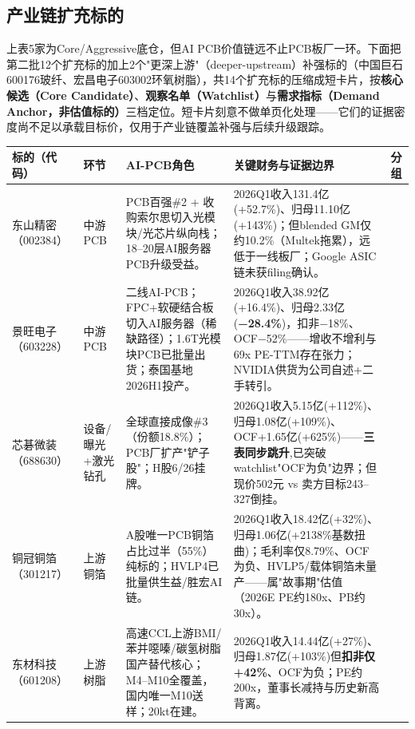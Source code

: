 \subsection{产业链扩充标的}

上表5家为Core/Aggressive底仓，但AI PCB价值链远不止PCB板厂一环。下面把第二批12个扩充标的加上2个"更深上游"（deeper-upstream）补强标的（中国巨石600176玻纤、宏昌电子603002环氧树脂），共14个扩充标的压缩成短卡片，按\textbf{核心候选（Core Candidate）}、\textbf{观察名单（Watchlist）}与\textbf{需求指标（Demand Anchor，非估值标的）}三档定位。短卡片刻意不做单页化处理——它们的证据密度尚不足以承载目标价，仅用于产业链覆盖补强与后续升级跟踪。

\begin{exhibitbox}[图表6-2：产业链扩充标的短卡片]
\footnotesize
\begin{tabularx}{\textwidth}{L{2.0cm}L{1.4cm}L{1.6cm}X L{1.9cm}}
\toprule
\textbf{标的（代码）} & \textbf{环节} & \textbf{AI-PCB角色} & \textbf{关键财务与证据边界} & \textbf{分组} \\
\midrule
东山精密（002384） & 中游PCB & PCB百强\#2 + 收购索尔思切入光模块/光芯片纵向栈；18--20层AI服务器PCB升级受益。 & 2026Q1收入131.4亿(+52.7\%)、归母11.10亿(+143\%)；但blended GM仅约10.2\%（Multek拖累），远低于一线板厂；Google ASIC链未获filing确认。 &  \\
\midrule
景旺电子（603228） & 中游PCB & 二线AI-PCB；FPC+软硬结合板切入AI服务器（稀缺路径）；1.6T光模块PCB已批量出货；泰国基地2026H1投产。 & 2026Q1收入38.92亿(+16.4\%)、归母2.33亿(\textbf{−28.4\%})，扣非−18\%、OCF−52\%——增收不增利与69x PE-TTM存在张力；NVIDIA供货为公司自述+二手转引。 &  \\
\midrule
芯碁微装（688630） & 设备/曝光+激光钻孔 & 全球直接成像\#3（份额18.8\%）；PCB厂扩产"铲子股"；H股6/26挂牌。 & 2026Q1收入5.15亿(+112\%)、归母1.08亿(+109\%)、OCF+1.65亿(+625\%)——\textbf{三表同步跳升},已突破watchlist"OCF为负"边界；但现价502元 vs 卖方目标243--327倒挂。 &  \\
\midrule
铜冠铜箔（301217） & 上游铜箔 & A股唯一PCB铜箔占比过半（55\%）纯标的；HVLP4已批量供生益/胜宏AI链。 & 2026Q1收入18.42亿(+32\%)、归母1.06亿(+2138\%基数扭曲)；毛利率仅8.79\%、OCF为负、HVLP5/载体铜箔未量产——属"故事期"估值（2026E PE约180x、PB约30x）。 &  \\
\midrule
东材科技（601208） & 上游树脂 & 高速CCL上游BMI/苯并噁嗪/碳氢树脂国产替代核心；M4--M10全覆盖，国内唯一M10送样；20kt在建。 & 2026Q1收入14.44亿(+27\%)、归母1.87亿(+103\%)但\textbf{扣非仅+42\%}、OCF为负；PE约200x，董事长减持与历史新高背离。 &  \\

\end{tabularx}
\end{exhibitbox}
